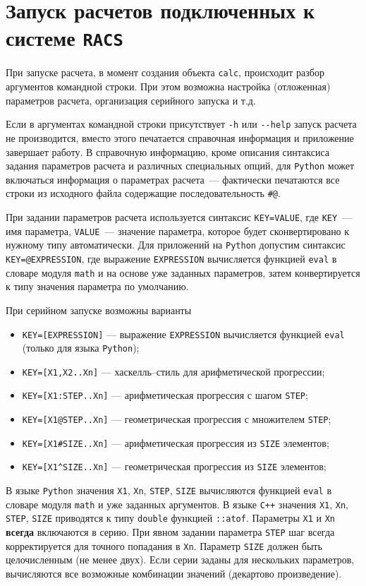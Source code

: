\section{Запуск расчетов подключенных к системе {\tt RACS}}
При запуске расчета, в момент создания объекта \verb'calc', происходит разбор аргументов командной строки.
При этом возможна настройка (отложенная) параметров расчета, организация серийного запуска и т.д.

Если в аргументах командной строки присутствует \verb'-h' или \verb'--help' запуск расчета не производится, вместо этого печатается
справочная информация и приложение завершает работу. В справочную информацию, кроме  описания синтаксиса задания параметров расчета
и различных специальных опций, для \verb'Python' может включаться информация о параметрах расчета~--- фактически
печатаются все строки из исходного файла содержащие последовательность \verb'#@'.

При задании параметров расчета используется синтаксис \verb'KEY=VALUE', где \verb'KEY'~--- имя параметра, \verb'VALUE'~--- значение параметра,
которое будет сконвертировано к нужному типу автоматически. Для приложений на \verb'Python' допустим синтаксис
\verb'KEY=@EXPRESSION', где выражение \verb'EXPRESSION' вычисляется 
функцией \verb'eval' в словаре модуля \verb'math' и на основе уже заданных параметров, затем 
конвертируется к типу значения параметра по умолчанию.

При серийном запуске возможны варианты
\begin{itemize}
\item\verb'KEY=[EXPRESSION]'  --- выражение \verb'EXPRESSION' вычисляется функцией \verb'eval' (только для языка \verb'Python');
\item\verb'KEY=[X1,X2..Xn]'   --- хаскелль--стиль для арифметической прогрессии;
\item\verb'KEY=[X1:STEP..Xn]' --- арифметическая прогрессия с шагом \verb'STEP';
\item\verb'KEY=[X1@STEP..Xn]' --- геометрическая прогрессия с множителем \verb'STEP';
\item\verb'KEY=[X1#SIZE..Xn]' --- арифметическая прогрессия из \verb'SIZE' элементов;
\item\verb'KEY=[X1^SIZE..Xn]' --- геометрическая прогрессия из \verb'SIZE' элементов;
\end{itemize}
В языке \verb'Python' значения \verb'X1', \verb'Xn', \verb'STEP', \verb'SIZE' вычисляются функцией \verb'eval' в словаре модуля \verb'math' и уже 
заданных аргументов. В языке \verb'C++' значения \verb'X1', \verb'Xn', \verb'STEP', \verb'SIZE'
приводятся к типу \verb'double' функцией \verb'::atof'.
Параметры \verb'X1' и \verb'Xn' {\bf всегда} включаются в серию. При явном задании 
параметра \verb'STEP' шаг всегда корректируется для точного попадания в \verb'Xn'. Параметр \verb'SIZE' 
должен быть целочисленным  (не менее двух). Если серии заданы для нескольких 
параметров, вычисляются все возможные комбинации значений (декартово произведение).

